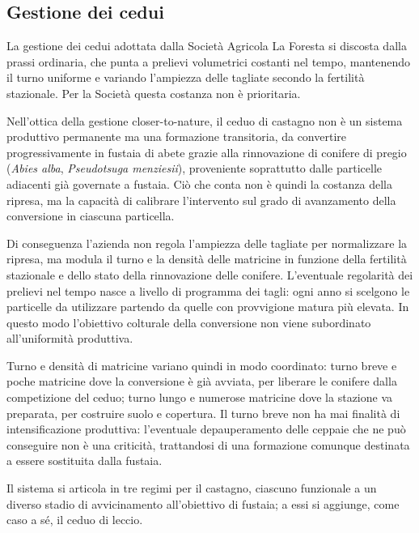 \subsection{Gestione dei cedui}
\label{sec:metodo:cedui}

La gestione dei cedui adottata dalla Società Agricola La Foresta si discosta
dalla prassi ordinaria, che punta a prelievi volumetrici costanti nel tempo,
mantenendo il turno uniforme e variando l'ampiezza delle tagliate secondo la
fertilità stazionale. Per la Società questa costanza non è prioritaria.

Nell'ottica della gestione closer-to-nature, il ceduo di castagno non è un
sistema produttivo permanente ma una formazione transitoria, da convertire
progressivamente in fustaia di abete grazie alla rinnovazione di conifere di
pregio ({\em Abies alba}, {\em Pseudotsuga menziesii}), proveniente soprattutto
dalle particelle adiacenti già governate a fustaia. Ciò che conta non è quindi
la costanza della ripresa, ma la capacità di calibrare l'intervento sul grado di
avanzamento della conversione in ciascuna particella.

Di conseguenza l'azienda non regola l'ampiezza delle tagliate per normalizzare
la ripresa, ma modula il turno e la densità delle matricine in funzione della
fertilità stazionale e dello stato della rinnovazione delle conifere.
L'eventuale regolarità dei prelievi nel tempo nasce a livello di programma dei
tagli: ogni anno si scelgono le particelle da utilizzare partendo da quelle con
provvigione matura più elevata. In questo modo l'obiettivo colturale della
conversione non viene subordinato all'uniformità produttiva.

Turno e densità di matricine variano quindi in modo coordinato: turno breve e
poche matricine dove la conversione è già avviata, per liberare le conifere
dalla competizione del ceduo; turno lungo e numerose matricine dove la stazione
va preparata, per costruire suolo e copertura. Il turno breve non ha mai
finalità di intensificazione produttiva: l'eventuale depauperamento delle
ceppaie che ne può conseguire non è una criticità, trattandosi di una formazione
comunque destinata a essere sostituita dalla fustaia.

Il sistema si articola in tre regimi per il castagno, ciascuno funzionale a un
diverso stadio di avvicinamento all'obiettivo di fustaia; a essi si aggiunge,
come caso a sé, il ceduo di leccio.

